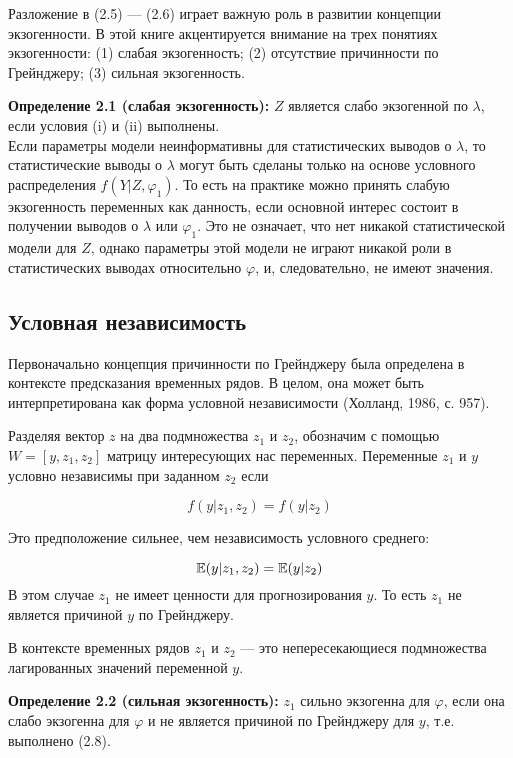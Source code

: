 Разложение в (2.5) --- (2.6) играет важную роль в развитии концепции экзогенности. В этой книге акцентируется внимание на трех понятиях экзогенности: (1) слабая экзогенность; (2) отсутствие причинности по Грейнджеру; (3) сильная экзогенность.

{\bf Определение 2.1 (слабая экзогенность):}  $Z$ является слабо экзогенной по $\lambda$, если условия (i) и (ii) выполнены.\\

Если параметры модели неинформативны для статистических выводов о $\lambda$, то статистические выводы о $\lambda $  могут быть сделаны только на основе условного распределения $f(Y|Z,\varphi_{1})$. То есть на практике можно принять слабую экзогенность переменных как данность, если основной интерес состоит в получении выводов о $\lambda$ или $\varphi_1$. Это не означает, что нет никакой статистической модели для $Z$, однако параметры этой модели не играют никакой роли в статистических выводах относительно $\varphi$, и, следовательно, не имеют значения. 

\subsection{Условная независимость}


Первоначально концепция причинности по Грейнджеру была определена в контексте предсказания  временных рядов. В целом, она может быть интерпретирована как форма условной независимости (Холланд, 1986, с. 957). 


Разделяя вектор $z$ на два подмножества $z_{1}$ и $z_{2}$, обозначим с помощью $W=[y,z_{1},z_{2}]$ матрицу интересующих нас переменных. Переменные $z_{1}$ и $y$ условно независимы при заданном $z_{2}$ если

\begin{equation}
f(y|z_{1},z_{2})=f(y|z_{2})
\end{equation}

Это предположение сильнее, чем независимость условного среднего:
 
\begin{equation}
\mathbb{E}(y|z_{1},z_{2})=\mathbb{E}(y|z_{2})
\end{equation}
В этом случае $z_{1}$ не имеет ценности для прогнозирования $y$. То есть $z_{1}$ не является причиной $y$ по Грейнджеру.

В контексте временных рядов $z_1$ и $z_2$ --- это непересекающиеся подмножества лагированных значений переменной $y$.

{\bf Определение 2.2 (сильная экзогенность):}  $z_{1}$ сильно экзогенна для $\varphi$, если она слабо экзогенна для $\varphi$ и не является причиной по Грейнджеру для $y$, т.е. выполнено (2.8).

